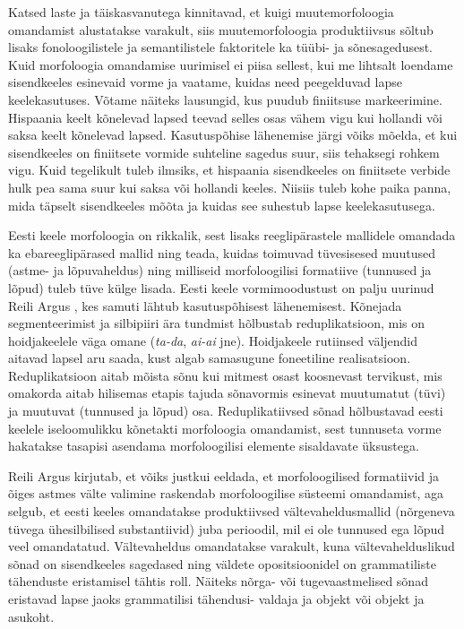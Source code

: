 \documentclass[12pt]{article}
\begin{document}
Katsed laste ja täiskasvanutega kinnitavad, et kuigi muutemorfoloogia omandamist alustatakse varakult, siis muutemorfoloogia produktiivsus sõltub lisaks fonoloogilistele ja semantilistele faktoritele ka tüübi- ja sõnesagedusest. Kuid morfoloogia omandamise uurimisel ei piisa sellest, kui me lihtsalt loendame sisendkeeles esinevaid vorme ja vaatame, kuidas need peegelduvad lapse keelekasutuses. Võtame näiteks lausungid, kus puudub finiitsuse markeerimine. Hispaania keelt kõnelevad lapsed teevad selles osas vähem vigu kui hollandi või saksa keelt kõnelevad lapsed. Kasutuspõhise lähenemise järgi võiks mõelda, et kui sisendkeeles on finiitsete vormide suhteline sagedus suur, siis tehaksegi rohkem vigu. Kuid tegelikult tuleb ilmsiks, et hispaania sisendkeeles on finiitsete verbide hulk pea sama suur kui saksa või hollandi keeles. Niisiis tuleb kohe paika panna, mida täpselt sisendkeeles mõõta ja kuidas see suhestub lapse keelekasutusega. \citep[2552--2554]{LIEVEN}

Eesti keele morfoloogia on rikkalik, sest lisaks reeglipärastele mallidele omandada ka ebareeglipärased mallid ning teada, kuidas toimuvad tüvesisesed muutused (astme- ja lõpuvaheldus) ning milliseid morfoloogilisi formatiive (tunnused ja lõpud) tuleb tüve külge lisada. Eesti keele vormimoodustust on palju uurinud Reili Argus \citep{ARGUSdiss}, kes samuti lähtub kasutuspõhisest lähenemisest. Kõnejada segmenteerimist ja silbipiiri ära tundmist hõlbustab reduplikatsioon, mis on hoidjakeelele väga omane (\emph{ta-da}, \emph{ai-ai} jne). Hoidjakeele rutiinsed väljendid aitavad lapsel aru saada, kust algab samasugune foneetiline realisatsioon. Reduplikatsioon aitab mõista sõnu kui mitmest osast koosnevast tervikust, mis omakorda aitab hilisemas etapis tajuda sõnavormis esinevat muutumatut (tüvi) ja muutuvat (tunnused ja lõpud) osa. Reduplikatiivsed sõnad hõlbustavad eesti keelele iseloomulikku kõnetakti morfoloogia omandamist, sest tunnuseta vorme hakatakse tasapisi asendama morfoloogilisi elemente sisaldavate üksustega. \citep[19--20]{ARGUSdiss}

Reili Argus \citep[23]{ARGUSdiss} kirjutab, et võiks justkui eeldada, et morfoloogilised formatiivid ja õiges astmes välte valimine raskendab morfoloogilise süsteemi omandamist, aga selgub, et eesti keeles omandatakse produktiivsed vältevaheldusmallid (nõrgeneva tüvega ühesilbilised substantiivid) juba perioodil, mil ei ole tunnused ega lõpud veel omandatatud. Vältevaheldus omandatakse varakult, kuna vältevahelduslikud sõnad on sisendkeeles sagedased ning väldete opositsioonidel on grammatiliste tähenduste eristamisel tähtis roll. Näiteks nõrga- või tugevaastmelised sõnad eristavad lapse jaoks grammatilisi tähendusi- valdaja ja objekt või objekt ja asukoht.
\end{document}
